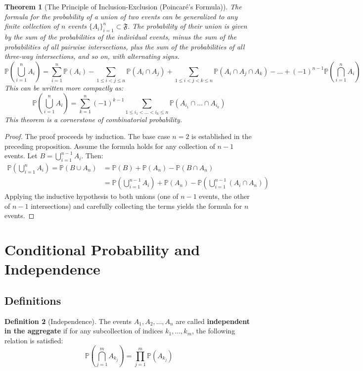 \documentclass[12pt, openany]{book}
\theoremstyle{definition}
\newtheorem{definition}{Definition}[section]
\theoremstyle{plain}
\newtheorem{theorem}[definition]{Theorem}
\theoremstyle{remark}
\newcommand{\probP}{\mathbb{P}}
\newcommand{\germF}{\mathfrak{F}} %
\begin{document}
\begin{theorem}[The Principle of Inclusion-Exclusion (Poincaré's Formula)]
The formula for the probability of a union of two events can be generalized to any finite collection of $n$ events $\{A_i\}_{i=1}^n \subset \germF$. The probability of their union is given by the sum of the probabilities of the individual events, minus the sum of the probabilities of all pairwise intersections, plus the sum of the probabilities of all three-way intersections, and so on, with alternating signs.
$$ \probP\left(\bigcup_{i=1}^n A_i\right) = \sum_{i=1}^n \probP(A_i) - \sum_{1 \le i < j \le n} \probP(A_i \cap A_j) + \sum_{1 \le i < j < k \le n} \probP(A_i \cap A_j \cap A_k) - \dots + (-1)^{n-1} \probP\left(\bigcap_{i=1}^n A_i\right) $$
This can be written more compactly as:
$$ \probP\left(\bigcup_{i=1}^n A_i\right) = \sum_{k=1}^n (-1)^{k-1} \sum_{1 \le i_1 < \dots < i_k \le n} \probP(A_{i_1} \cap \dots \cap A_{i_k}) $$
This theorem is a cornerstone of combinatorial probability.
\end{theorem}
\begin{proof}
The proof proceeds by induction. The base case $n=2$ is established in the preceding proposition. Assume the formula holds for any collection of $n-1$ events. Let $B = \bigcup_{i=1}^{n-1} A_i$. Then:
\begin{align*}
    \probP\left(\bigcup_{i=1}^n A_i\right) = \probP(B \cup A_n) &= \probP(B) + \probP(A_n) - \probP(B \cap A_n) \\
    &= \probP\left(\bigcup_{i=1}^{n-1} A_i\right) + \probP(A_n) - \probP\left(\bigcup_{i=1}^{n-1} (A_i \cap A_n)\right)
\end{align*}
Applying the inductive hypothesis to both unions (one of $n-1$ events, the other of $n-1$ intersections) and carefully collecting the terms yields the formula for $n$ events.
\end{proof}

\section{Conditional Probability and Independence}

\subsection{Definitions}

\begin{definition}[Independence]
The events $A_1, A_2, \dots, A_n$ are called \textbf{independent in the aggregate} if for any subcollection of indices $k_1, \dots, k_m$, the following relation is satisfied:
$$ \probP\left(\bigcap_{j=1}^{m} A_{k_j}\right) = \prod_{j=1}^{m} \probP(A_{k_j}) $$
\end{definition}
\end{document}
